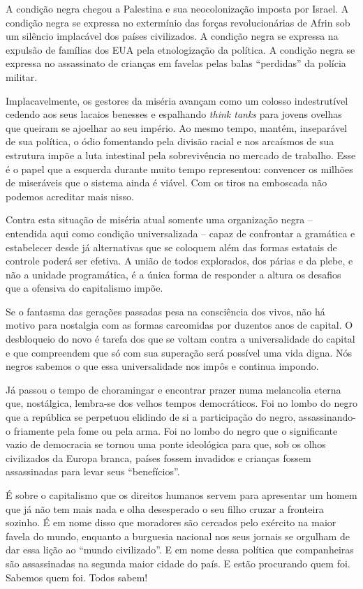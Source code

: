 A condição negra chegou a Palestina e sua neocolonização imposta por
Israel. A condição negra se expressa no extermínio das forças
revolucionárias de Afrin sob um silêncio implacável dos países
civilizados. A condição negra se expressa na expulsão de famílias dos
EUA pela etnologização da política. A condição negra se expressa no
assassinato de crianças em favelas pelas balas ``perdidas'' da polícia
militar.

Implacavelmente, os gestores da miséria avançam como um colosso
indestrutível cedendo aos seus lacaios benesses e espalhando \emph{think
tanks} para jovens ovelhas que queiram se ajoelhar ao seu império. Ao
mesmo tempo, mantém, inseparável de sua política, o ódio fomentando pela
divisão racial e nos arcaísmos de sua estrutura impõe a luta intestinal
pela sobrevivência no mercado de trabalho. Esse é o papel que a esquerda
durante muito tempo representou: convencer os milhões de miseráveis que
o sistema ainda é viável. Com os tiros na emboscada não podemos
acreditar mais nisso.

Contra esta situação de miséria atual somente uma organização negra --
entendida aqui como condição universalizada -- capaz de confrontar a
gramática e estabelecer desde já alternativas que se coloquem além das
formas estatais de controle poderá ser efetiva. A união de todos
explorados, dos párias e da plebe, e não a unidade programática, é a
única forma de responder a altura os desafios que a ofensiva do
capitalismo impõe.

Se o fantasma das gerações passadas pesa na consciência dos vivos, não
há motivo para nostalgia com as formas carcomidas por duzentos anos de
capital. O desbloqueio do novo é tarefa dos que se voltam contra a
universalidade do capital e que compreendem que só com sua superação
será possível uma vida digna. Nós negros sabemos o que essa
universalidade nos impôs e continua impondo.

Já passou o tempo de choramingar e encontrar prazer numa melancolia
eterna que, nostálgica, lembra-se dos velhos tempos democráticos. Foi no
lombo do negro que a república se perpetuou elidindo de si a
participação do negro, assassinando-o friamente pela fome ou pela arma.
Foi no lombo do negro que o significante vazio de democracia se tornou
uma ponte ideológica para que, sob os olhos civilizados da Europa
branca, países fossem invadidos e crianças fossem assassinadas para
levar seus ``benefícios''.

É sobre o capitalismo que os direitos humanos servem para apresentar um
homem que já não tem mais nada e olha desesperado o seu filho cruzar a
fronteira sozinho. É em nome disso que moradores são cercados pelo
exército na maior favela do mundo, enquanto a burguesia nacional nos
seus jornais se orgulham de dar essa lição ao ``mundo civilizado''. E em
nome dessa política que companheiras são assassinadas na segunda maior
cidade do país. E estão procurando quem foi. Sabemos quem foi. Todos
sabem!


